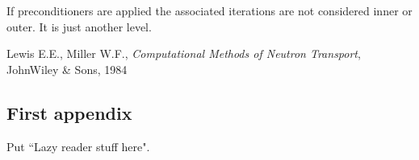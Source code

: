 \documentclass[11pt,letterpaper,notitlepage]{article}
\numberwithin{equation}{section}
\begin{document}
If preconditioners are applied the associated iterations are not considered inner or outer. It is just another level.







\newpage
\begin{thebibliography}{1}
	
	 Lewis E.E., Miller W.F., {\em Computational Methods of Neutron Transport}, JohnWiley \& Sons, 1984
	   
\end{thebibliography}

\newpage
\begin{appendices}
\section{First appendix}
Put ``Lazy reader stuff here".
\end{appendices}
\end{document}
